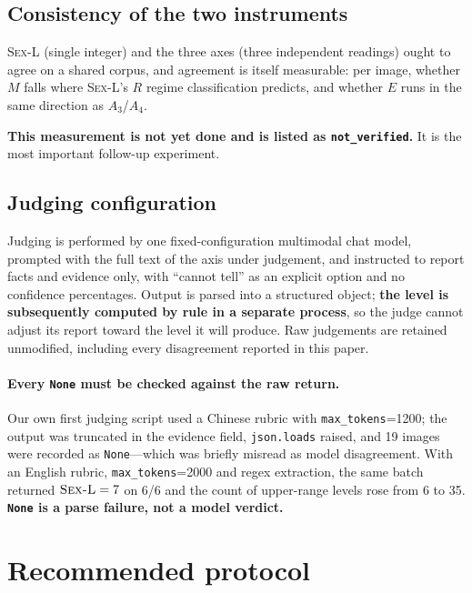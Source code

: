 \documentclass[11pt]{article}
\newcommand{\axm}{M}
\newcommand{\axe}{E}
\newcommand{\sexl}{\textsc{Sex-L}}
\begin{document}
\subsection{Consistency of the two instruments}
\label{sec:consistency}

\sexl{} (single integer) and the three axes (three independent readings) ought
to agree on a shared corpus, and agreement is itself measurable: per image,
whether $\axm$ falls where \sexl's $R$ regime classification predicts, and
whether $\axe$ runs in the same direction as $A_3$/$A_4$.

\textbf{This measurement is not yet done and is listed as
\texttt{not\_verified}.} It is the most important follow-up experiment.

\subsection{Judging configuration}
\label{sec:judge-config}

Judging is performed by one fixed-configuration multimodal chat model, prompted
with the full text of the axis under judgement, and instructed to report facts
and evidence only, with ``cannot tell'' as an explicit option and no confidence
percentages. Output is parsed into a structured object; \textbf{the level is
subsequently computed by rule in a separate process}, so the judge cannot
adjust its report toward the level it will produce. Raw judgements are retained
unmodified, including every disagreement reported in this paper.

\paragraph{Every \texttt{None} must be checked against the raw return.} Our own
first judging script used a Chinese rubric with \texttt{max\_tokens}=1200; the
output was truncated in the evidence field, \texttt{json.loads} raised, and 19
images were recorded as \texttt{None}---which was briefly misread as model
disagreement. With an English rubric, \texttt{max\_tokens}=2000 and regex
extraction, the same batch returned $\text{\sexl}=7$ on 6/6 and the count of
upper-range levels rose from 6 to 35. \textbf{\texttt{None} is a parse failure,
not a model verdict.}

\section{Recommended protocol}
\label{sec:protocol}
\end{document}
